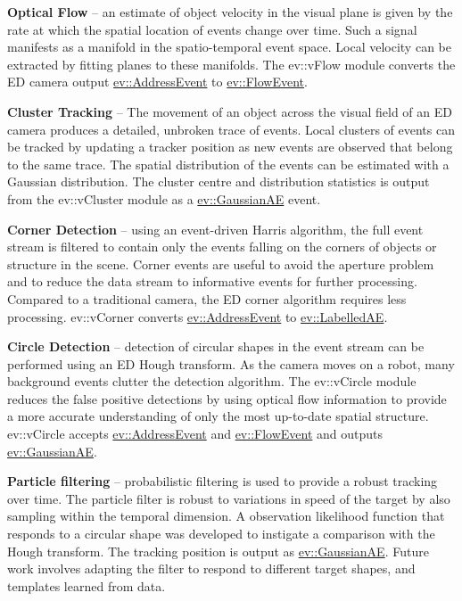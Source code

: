 \begin{DoxyItemize}
\item {\bfseries Optical Flow} -- an estimate of object velocity in the visual plane is given by the rate at which the spatial location of events change over time. Such a signal manifests as a manifold in the spatio-\/temporal event space. Local velocity can be extracted by fitting planes to these manifolds. The {\ttfamily ev\+::v\+Flow} module converts the ED camera output {\ttfamily \hyperlink{classev_1_1AddressEvent}{ev\+::\+Address\+Event}} to {\ttfamily \hyperlink{classev_1_1FlowEvent}{ev\+::\+Flow\+Event}}.
\item {\bfseries Cluster Tracking} -- The movement of an object across the visual field of an ED camera produces a detailed, unbroken trace of events. Local clusters of events can be tracked by updating a tracker position as new events are observed that belong to the same trace. The spatial distribution of the events can be estimated with a Gaussian distribution. The cluster centre and distribution statistics is output from the {\ttfamily ev\+::v\+Cluster} module as a {\ttfamily \hyperlink{classev_1_1GaussianAE}{ev\+::\+Gaussian\+AE}} event.
\item {\bfseries Corner Detection} -- using an event-\/driven Harris algorithm, the full event stream is filtered to contain only the events falling on the corners of objects or structure in the scene. Corner events are useful to avoid the aperture problem and to reduce the data stream to informative events for further processing. Compared to a traditional camera, the ED corner algorithm requires less processing. {\ttfamily ev\+::v\+Corner} converts {\ttfamily \hyperlink{classev_1_1AddressEvent}{ev\+::\+Address\+Event}} to {\ttfamily \hyperlink{classev_1_1LabelledAE}{ev\+::\+Labelled\+AE}}.
\item {\bfseries Circle Detection} -- detection of circular shapes in the event stream can be performed using an ED Hough transform. As the camera moves on a robot, many background events clutter the detection algorithm. The {\ttfamily ev\+::v\+Circle} module reduces the false positive detections by using optical flow information to provide a more accurate understanding of only the most up-\/to-\/date spatial structure. {\ttfamily ev\+::v\+Circle} accepts {\ttfamily \hyperlink{classev_1_1AddressEvent}{ev\+::\+Address\+Event}} and {\ttfamily \hyperlink{classev_1_1FlowEvent}{ev\+::\+Flow\+Event}} and outputs {\ttfamily \hyperlink{classev_1_1GaussianAE}{ev\+::\+Gaussian\+AE}}.
\item {\bfseries Particle filtering} -- probabilistic filtering is used to provide a robust tracking over time. The particle filter is robust to variations in speed of the target by also sampling within the temporal dimension. A observation likelihood function that responds to a circular shape was developed to instigate a comparison with the Hough transform. The tracking position is output as {\ttfamily \hyperlink{classev_1_1GaussianAE}{ev\+::\+Gaussian\+AE}}. Future work involves adapting the filter to respond to different target shapes, and templates learned from data.
\end{DoxyItemize}

